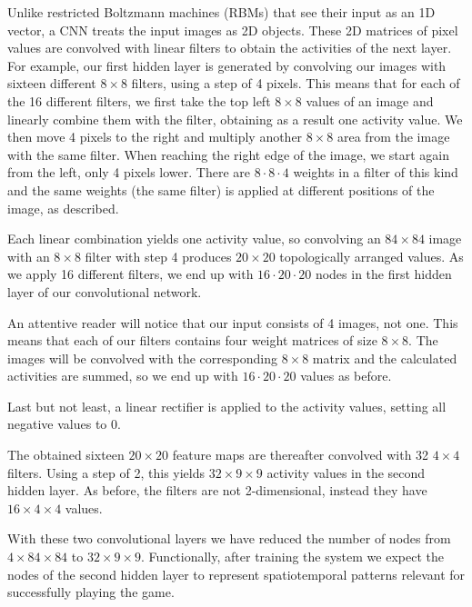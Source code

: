 \documentclass[a4paper,12pt]{article}
\begin{document}
Unlike restricted Boltzmann machines (RBMs) that see their input as an 1D vector, a CNN treats the input images as 2D objects. These 2D matrices of pixel values are convolved with linear filters to obtain the activities of the next layer. For example, our first hidden layer is generated by convolving our images with sixteen different $8 \times 8$ filters, using a step of 4 pixels. This means that for each of the 16 different filters, we first take the top left $8 \times 8$ values of an image and linearly combine them with the filter, obtaining as a result one activity value. We then move 4 pixels to the right and multiply another $8  \times 8$ area from the image with the same filter.   When reaching the right edge of the image, we start again from the left, only 4 pixels lower. There are $8  \cdot 8 \cdot 4$ weights in a filter of this kind and the same weights (the same filter) is applied at different positions of the image, as described.

Each linear combination yields one activity value, so convolving an $84  \times 84$ image with an $8 \times 8$ filter with step 4 produces $20 \times 20$ topologically arranged values. As we apply 16 different filters, we end up with $16 \cdot 20 \cdot 20$ nodes in the first hidden layer of our convolutional network. 

An attentive reader will notice that our input consists of 4 images, not one. This means that each of our filters contains four weight matrices of size $8 \times 8$. The images will be convolved with the corresponding $8 \times 8$ matrix and the calculated activities are summed, so we end up with $16 \cdot 20 \cdot 20$ values as before.

Last but not least, a linear rectifier is applied to the activity values, setting all negative values to 0.

The obtained sixteen $20 \times 20$ feature maps are thereafter convolved with 32 $4 \times 4$ filters. Using a step of 2, this yields $32 \times 9 \times 9$ activity values in the second hidden layer. As before, the filters are not 2-dimensional, instead they have $16 \times 4 \times 4$ values.

With these two convolutional layers we have reduced the number of nodes from $4 \times 84 \times 84$ to $32 \times 9 \times 9$. Functionally, after training the system we expect the nodes of the second hidden layer to represent spatiotemporal patterns relevant for successfully playing the game.
\end{document}
